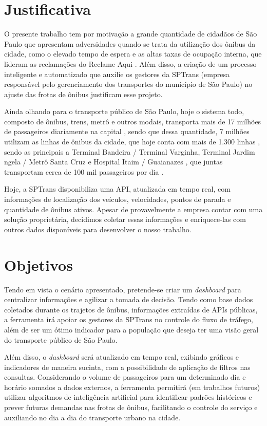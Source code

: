 \section{Justificativa}
\indent
\par O presente trabalho tem por motivação a grande quantidade de cidadãos de São Paulo que apresentam adversidades quando se trata da utilização dos ônibus da cidade, como o elevado tempo de espera e as altas taxas de ocupação interna, que lideram as reclamações do Reclame Aqui \cite{ReclameAqui1} \cite{ReclameAqui2}. Além disso, a criação de um processo inteligente e automatizado que auxilie os gestores da SPTrans (empresa responsável pelo gerenciamento dos transportes do município de São Paulo) no ajuste das frotas de ônibus justificam esse projeto.
\indent
\par Ainda olhando para o transporte público de São Paulo, hoje o sistema todo, composto de ônibus, trens, metrô e outros modais, transporta mais de 17 milhões de passageiros diariamente na capital \cite{G1SaoPaulo}, sendo que dessa quantidade, 7 milhões utilizam as linhas de ônibus da cidade, que hoje conta com mais de 1.300 linhas \cite{MobilidadeSampa}, sendo as principais a Terminal Bandeira / Terminal Varginha, Terminal Jardim  ngela / Metrô Santa Cruz e Hospital Itaim / Guaianazes , que juntas transportam cerca de 100 mil passageiros por dia \cite{Viatrolebus}.
\par Hoje, a SPTrans disponibiliza uma API, atualizada em tempo real, com informações de localização dos veículos, velocidades, pontos de parada e quantidade de ônibus ativos. Apesar de provavelmente a empresa contar com uma solução proprietária, decidimos coletar essas informações e enriquece-las com outros dados disponíveis para desenvolver o nosso trabalho.

\section{Objetivos}
\indent
\par Tendo em vista o cenário apresentado, pretende-se criar um \textit{dashboard} para centralizar informações e agilizar a tomada de decisão. Tendo como base dados coletados durante os trajetos de ônibus, informações extraídas de APIs públicas,  a ferramenta irá apoiar os gestores da SPTrans no controle do fluxo de tráfego, além de ser um ótimo indicador para a população que deseja ter uma visão geral do transporte público de São Paulo. 
\par Além disso, o \textit{dashboard} será atualizado em tempo real, exibindo gráficos e indicadores de maneira sucinta, com a possibilidade de aplicação de filtros nas consultas. Considerando o volume de passageiros para um determinado dia e horário somados a dados externos, a ferramenta permitirá (em trabalhos futuros) utilizar algoritmos de inteligência artificial para identificar padrões históricos e prever futuras demandas nas frotas de ônibus, facilitando o controle do serviço e auxiliando no dia a dia do transporte urbano na cidade.

